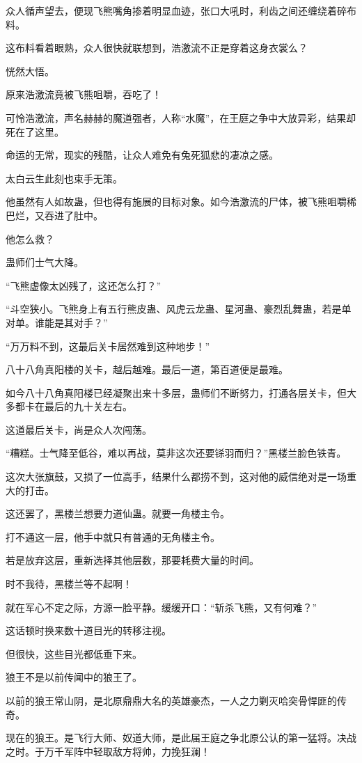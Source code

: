 \begin{this_body}
众人循声望去，便现飞熊嘴角掺着明显血迹，张口大吼时，利齿之间还缠绕着碎布料。

这布料看着眼熟，众人很快就联想到，浩激流不正是穿着这身衣裳么？

恍然大悟。

原来浩激流竟被飞熊咀嚼，吞吃了！

可怜浩激流，声名赫赫的魔道强者，人称“水魔”，在王庭之争中大放异彩，结果却死在了这里。

命运的无常，现实的残酷，让众人难免有兔死狐悲的凄凉之感。

太白云生此刻也束手无策。

他虽然有人如故蛊，但也得有施展的目标对象。如今浩激流的尸体，被飞熊咀嚼稀巴烂，又吞进了肚中。

他怎么救？

蛊师们士气大降。

“飞熊虚像太凶残了，这还怎么打？”

“斗空狭小。飞熊身上有五行熊皮蛊、风虎云龙蛊、星河蛊、豪烈乱舞蛊，若是单对单。谁能是其对手？”

“万万料不到，这最后关卡居然难到这种地步！”

八十八角真阳楼的关卡，越后越难。最后一道，第百道便是最难。

如今八十八角真阳楼已经凝聚出来十多层，蛊师们不断努力，打通各层关卡，但大多都卡在最后的九十关左右。

这道最后关卡，尚是众人次闯荡。

“糟糕。士气降至低谷，难以再战，莫非这次还要铩羽而归？”黑楼兰脸色铁青。

这次大张旗鼓，又损了一位高手，结果什么都捞不到，这对他的威信绝对是一场重大的打击。

这还罢了，黑楼兰想要力道仙蛊。就要一角楼主令。

打不通这一层，他手中就只有普通的无角楼主令。

若是放弃这层，重新选择其他层数，那要耗费大量的时间。

时不我待，黑楼兰等不起啊！

就在军心不定之际，方源一脸平静。缓缓开口：“斩杀飞熊，又有何难？”

这话顿时换来数十道目光的转移注视。

但很快，这些目光都低垂下来。

狼王不是以前传闻中的狼王了。

以前的狼王常山阴，是北原鼎鼎大名的英雄豪杰，一人之力剿灭哈突骨悍匪的传奇。

现在的狼王。是飞行大师、奴道大师，是此届王庭之争北原公认的第一猛将。决战之时。于万千军阵中轻取敌方将帅，力挽狂澜！


\end{this_body}
